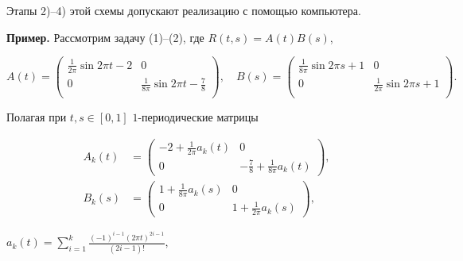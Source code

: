 Этапы 2)--4) этой схемы допускают реализацию с помощью компьютера.


\medskip





{\bf Пример.} Рассмотрим задачу (1)--(2), где $R(t,s)=A(t)B(s)$,


$$


A(t)=\begin{pmatrix}


\frac{1}{2\pi}\sin 2\pi t-2&0\\


0&\frac{1}{8\pi}\sin 2\pi t-\frac78\\


\end{pmatrix},\quad


B(s)=\begin{pmatrix}


\frac{1}{8\pi}\sin 2\pi s+1&0\\


0&\frac{1}{2\pi}\sin 2\pi s+1\\


\end{pmatrix}.


$$





Полагая при $t,s\in[0,1]$ $1$-периодические матрицы


\begin{align*}


A_k(t)&=\begin{pmatrix}


-2+\frac1{2\pi}a_k(t) & 0\\


0 & -\frac78+\frac1{8\pi} a_k(t)


\end{pmatrix},


\\


B_k(s)&=\begin{pmatrix}


1+\frac1{8\pi}a_k(s) & 0\\


0 & 1+\frac1{2\pi}a_k(s)


\end{pmatrix},


\end{align*}


$a_k(t)=\sum\limits_{i=1}^{k}\frac{(-1)^{i-1}(2\pi t)^{2i-1}}{(2i-1)!}$,


